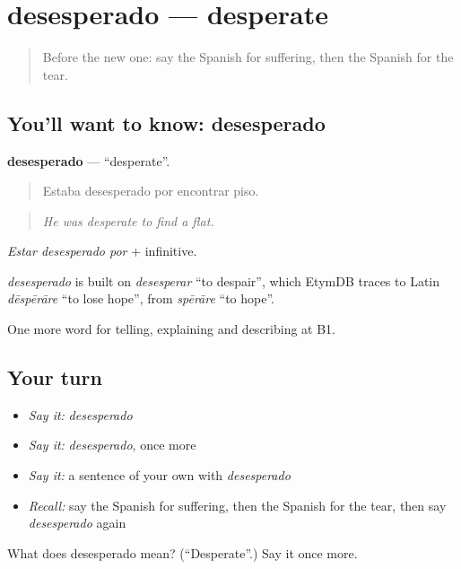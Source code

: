 \section[desesperado]{desesperado — desperate}

\label{lesson:ES-C717-desesperado}



\begin{quote}
Before the new one: say the Spanish for suffering, then the Spanish for the tear.
\end{quote}

\subsection*{You'll want to know: desesperado}
\textbf{desesperado} — \textquotedblleft{}desperate\textquotedblright{}.

\begin{quote}
Estaba desesperado por encontrar piso.
\end{quote}

\begin{quote}
\emph{He was desperate to find a flat.}
\end{quote}

\emph{Estar desesperado por} + infinitive.

\begin{cousinweb}
\emph{desesperado} is built on \emph{desesperar} \textquotedblleft{}to despair\textquotedblright{}, which EtymDB traces to Latin \emph{dēspērāre} \textquotedblleft{}to lose hope\textquotedblright{}, from \emph{spērāre} \textquotedblleft{}to hope\textquotedblright{}.
\end{cousinweb}

\begin{grammarlens}[title={What you've built}]
One more word for telling, explaining and describing at B1.
\end{grammarlens}

\subsection*{Your turn}
\begin{itemize}
\raggedright
  \item \emph{Say it:} \emph{desesperado}
  \item \emph{Say it:} \emph{desesperado}, once more
  \item \emph{Say it:} a sentence of your own with \emph{desesperado}
  \item \emph{Recall:} say the Spanish for suffering, then the Spanish for the tear, then say \emph{desesperado} again
\end{itemize}

\begin{tcolorbox}[breakable,colback=teal!4,colframe=teal!35!black,title={Before you move on}]
What does desesperado mean? (\textquotedblleft{}Desperate\textquotedblright{}.) Say it once more.
\end{tcolorbox}
